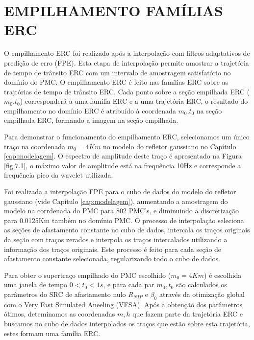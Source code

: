 %
% 
% 
% 
% 
% 
% 

\chapter{EMPILHAMENTO FAMÍLIAS ERC}
\label{cap:empilhamento}

O empilhamento ERC foi realizado após a interpolação com filtros adaptativos de predição de erro (FPE). Esta etapa de
interpolação permite amostrar a trajetória de tempo de trânsito ERC com um intervalo de amostragem satisfatório no
domínio do PMC. O empilhamento ERC é feito nas famílias ERC sobre as trajtórias de tempo de trânsito ERC. Cada ponto sobre
a seção empilhada ERC ($m_0$,$t_0$) corresponderá a uma família ERC e a uma trajetória ERC, 
o resultado do empilhamento no domínio
ERC é atribuído à coordenada $m_0$,$t_0$ na seção empilhada ERC, formando a imagem na seção empilhada.

Para demonstrar o funcionamento do empilhamento ERC, selecionamos um único traço na coordenada $m_0=4Km$ no modelo do refletor
gaussiano no Capítulo \ref{cap:modelagem}. O espectro de amplitude deste traço é apresentado na Figura \ref{fig:7.1}, o máximo valor de amplitude 
está na frequência 10Hz e corresponde a frequência pico da wavelet utilizada.


Foi realizada a interpolação FPE para o cubo de dados do modelo do refletor gaussiano (vide Capítulo \ref{cap:modelagem}),
aumentando a amostragem
do modelo na corrdenada do PMC para 802 PMC's, e diminuindo a discretização para 0.0125Km também no domínio PMC. O processo 
de interpolação seleciona as seções de afastamento constante no cubo de dados, intercala os traços originais da seção com traços 
zerados e interpola os traços intercalados utilizando a informação dos traços originais. Este processo é feito para cada seção
de afastamento constante selecionada, regularizando todo o cubo de dados.

Para obter o supertraço empilhado do PMC escolhido ($m_0=4Km$) é escolhida uma janela de tempo $0<t_0<1s$, 
e para cada par $m_0,t_0$
são calculados os parâmetros do SRC de afastamento nulo $R_{NIP}$ e $\beta_0$ através da otimização global com o Very Fast
Simulated Aneeling (VFSA). Após a obtenção dos parâmetros ótimos, deteminamos as coordenadas $m,h$ que fazem parte da trajetória ERC
e buscamos no cubo de dados interpolados os traços que estão sobre esta trajetória, estes formam uma família ERC.

